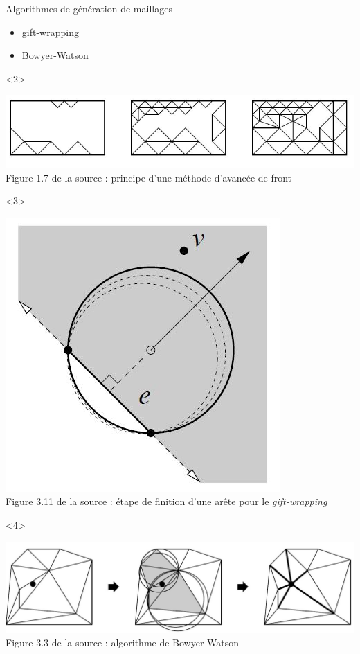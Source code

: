 \documentclass[aspectratio=169, 12pt, a4paper, hyperref={pdfauthor={Alexandre MARIN}, pdfkeywords={IFPEN, Delaunay, Voronoi, mesh generation}, colorlinks=true, linkcolor=purple, urlcolor=blue, citecolor=magenta}]{beamer}
\begin{document}
\begin{Energie}{Algorithmes de génération de maillages}

\begin{itemize}
\item<1-3> gift-wrapping
\item<1,4> Bowyer-Watson
\end{itemize}
\begin{onlyenv}<2>
\begin{center}
\includegraphics[scale=0.7]{advancingFront.jpg}
\\Figure 1.7 de la source \cite{delnotes} : principe d'une méthode d'avancée de front
\end{center}
\end{onlyenv}
\begin{onlyenv}<3>
\begin{center}
\includegraphics[scale=0.5]{giftWrappingStep.jpg}
\\Figure 3.11 de la source \cite{delnotes} : étape de finition d'une arête pour le \emph{gift-wrapping}
\end{center}
\end{onlyenv}
\begin{onlyenv}<4>
\begin{center}
\includegraphics[scale=0.5]{bowyerWatson.jpg}
\\Figure 3.3 de la source \cite{delnotes} : algorithme de Bowyer-Watson
\end{center}
\end{onlyenv}
\end{Energie}
\end{document}
